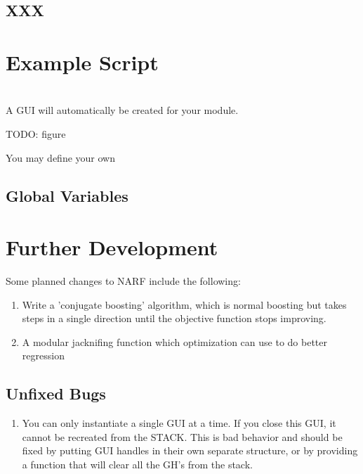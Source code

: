 \documentclass{article}
\begin{document}
\subsection{XXX}


\section{Example Script}

\section{}

A GUI will automatically be created for your module. 

TODO: figure

You may define your own

\subsection{Global Variables}

\section{Further Development}

Some planned changes to NARF include the following:

\begin{enumerate}
\item Write a 'conjugate boosting' algorithm, which is normal boosting but takes steps in a single direction until the objective function stops improving.
\item A modular jacknifing function which optimization can use to do better regression
\end{enumerate}

\subsection{Unfixed Bugs}
\begin{enumerate}
\item You can only instantiate a single GUI at a time. If you close this GUI, it cannot be recreated from the STACK. This is bad behavior and should be fixed by putting GUI handles in their own separate structure, or by providing a function that will clear all the GH's from the stack.
\end{enumerate}
\end{document}
